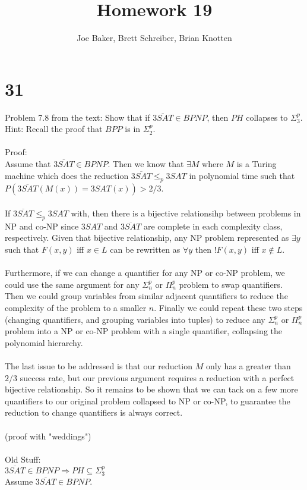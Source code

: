\documentclass[letterpaper,notitlepage,twoside]{article}
\renewcommand{\implies}{\Rightarrow} %
\begin{document}
\title{Homework 19}
\author{Joe Baker, Brett Schreiber, Brian Knotten}
\maketitle

\section*{31}
Problem 7.8 from the text: Show that if $\overline{3SAT} \in BPNP$, then $PH$ collapses to $\Sigma_3^p$.
\\
Hint: Recall the proof that $BPP$ is in $\Sigma_2^p$.
\\\\
Proof:
\\
Assume that $\overline{3SAT} \in BPNP$. Then we know that $\exists M$ where $M$ is a Turing machine which does the reduction $\overline{3SAT} \leq_p 3SAT$ in polynomial time such that $P(\overline{3SAT}(M(x)) = 3SAT(x)) > 2/3$.
\\\\
If $\overline{3SAT} \leq_p 3SAT$ with, then there is a bijective relationsihp between problems in NP and co-NP since $3SAT$ and $\overline{3SAT}$ are complete in each complexity class, respectively. Given that bijective relationship, any NP problem represented as $\exists y$ such that $F(x,y)$ iff $x \in L$ can be rewritten as $\forall y$ then $!F(x,y)$ iff $x \notin L$.
\\\\
Furthermore, if we can change a quantifier for any NP or co-NP problem, we could use the same argument for any $\Sigma_n^p$ or $\Pi_n^p$ problem to swap quantifiers. Then we could group variables from similar adjacent quantifiers to reduce the complexity of the problem to a smaller $n$. Finally we could repeat these two steps (changing quantifiers, and grouping variables into tuples) to reduce any $\Sigma_n^p$ or $\Pi_n^p$ problem into a NP or co-NP problem with a single quantifier, collapsing the polynomial hierarchy.
\\\\
The last issue to be addressed is that our reduction $M$ only has a greater than $2/3$ success rate, but our previous argument requires a reduction with a perfect bijective relationship. So it remains to be shown that we can tack on a few more quantifiers to our original problem collapsed to NP or co-NP, to guarantee the reduction to change quantifiers is always correct.
\\\\
(proof with "weddings")
\\\\
Old Stuff:
\\
$\overline{3SAT} \in BPNP \implies PH \subseteq \Sigma_3^p$ \\
Assume $\overline{3SAT} \in BPNP$. \\\\
\end{document}

